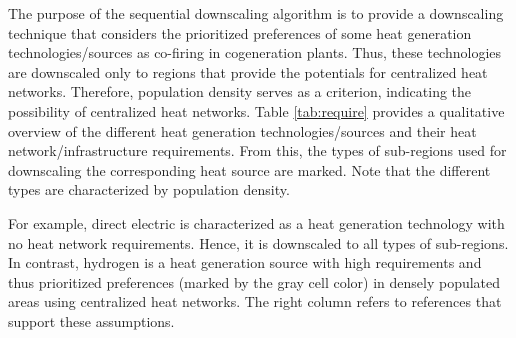 The purpose of the sequential downscaling algorithm is to provide a downscaling technique that considers the prioritized preferences of some heat generation technologies/sources as co-firing in cogeneration plants. Thus, these technologies are downscaled only to regions that provide the potentials for centralized heat networks. Therefore, population density serves as a criterion, indicating the possibility of centralized heat networks. Table \ref{tab:require} provides a qualitative overview of the different heat generation technologies/sources and their heat network/infrastructure requirements. From this, the types of sub-regions used for downscaling the corresponding heat source are marked. Note that the different types are characterized by population density.
\vspace{0.3cm}
\begin{table}[h]
	\centering
	\setlength{\extrarowheight}{.5em}
	\caption{Qualitative overview for heat generation technologies/sources and their requirments for heat network infrastructure. The prioritized preferences (gray cell color) of heat sources in sub-regions is marked by the gray color.}
	\label{tab:require}
\end{table}
For example, direct electric is characterized as a heat generation technology with no heat network requirements. Hence, it is downscaled to all types of sub-regions. In contrast, hydrogen is a heat generation source with high requirements and thus prioritized preferences (marked by the gray cell color) in densely populated areas using centralized heat networks. The right column refers to references that support these assumptions.\newline

